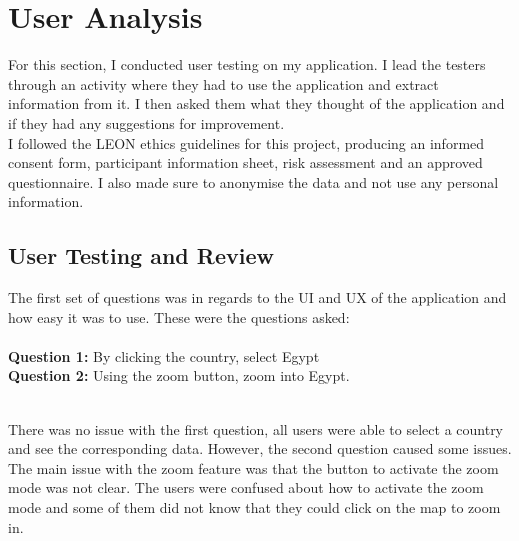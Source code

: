 \documentclass{report}
\begin{document}
\chapter{User Analysis}
For this section, I conducted user testing on my application. I lead the testers through an activity where they had to use the application and extract information from it. I then asked them what they thought of the application and if they had any suggestions for improvement.\\

I followed the LEON ethics guidelines for this project, producing an informed consent form, participant information sheet, risk assessment and an approved questionnaire. I also made sure to anonymise the data and not use any personal information.
\section{User Testing and Review}
The first set of questions was in regards to the UI and UX of the application and how easy it was to use. These were the questions asked:\\ \\
\textbf{Question 1: }By clicking the country, select Egypt\\
\textbf{Question 2: }Using the zoom button, zoom into Egypt.\\

\noindent
\begin{minipage}[t]{0.45\textwidth}
    \centering
\end{minipage}
\hfill
\begin{minipage}[t]{0.45\textwidth}
    \centering
\end{minipage}
\newline
\\There was no issue with the first question, all users were able to select a country and see the corresponding data. However, the second question caused some issues. The main issue with the zoom feature was that the button to activate the zoom mode was not clear. The users were confused about how to activate the zoom mode and some of them did not know that they could click on the map to zoom in.\\
\end{document}
